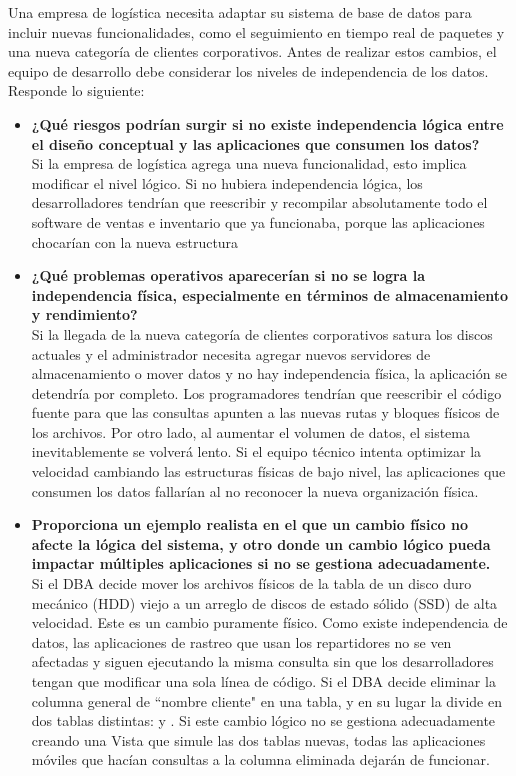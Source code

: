 \item Una empresa de logística necesita adaptar su sistema de base de datos para incluir nuevas funcionalidades, como el seguimiento en tiempo real de paquetes y una nueva categoría de clientes corporativos. Antes de realizar estos cambios, el equipo de desarrollo debe considerar los niveles de independencia de los datos. Responde lo siguiente:

\begin{itemize}
	\item \textbf{¿Qué riesgos podrían surgir si no existe independencia lógica entre el diseño conceptual y las aplicaciones que consumen los datos?}\\
	      Si la empresa de logística agrega una nueva funcionalidad, esto implica modificar el nivel lógico. Si no hubiera independencia lógica, los desarrolladores tendrían que reescribir y recompilar absolutamente todo el software de ventas e inventario que ya funcionaba, porque las aplicaciones chocarían con la nueva estructura

	\item \textbf{¿Qué problemas operativos aparecerían si no se logra la independencia física, especialmente en términos de almacenamiento y rendimiento?}\\
	      Si la llegada de la nueva categoría de clientes corporativos satura los discos actuales y el administrador necesita agregar nuevos servidores de almacenamiento o mover datos y no hay independencia física, la aplicación se detendría por completo. Los programadores tendrían que reescribir el código fuente para que las consultas apunten a las nuevas rutas y bloques físicos de los archivos. Por otro lado, al aumentar el volumen de datos, el sistema inevitablemente se volverá lento. Si el equipo técnico intenta optimizar la velocidad cambiando las estructuras físicas de bajo nivel, las aplicaciones que consumen los datos fallarían al no reconocer la nueva organización física.

	\item \textbf{Proporciona un ejemplo realista en el que un cambio físico no afecte la lógica del sistema, y otro donde un cambio lógico pueda impactar múltiples aplicaciones si no se gestiona adecuadamente.}\\
	      Si el DBA decide mover los archivos físicos de la tabla  de un disco duro mecánico (HDD) viejo a un arreglo de discos de estado sólido (SSD) de alta velocidad. Este es un cambio puramente físico. Como existe independencia de datos, las aplicaciones de rastreo que usan los repartidores no se ven afectadas y siguen ejecutando la misma consulta sin que los desarrolladores tengan que modificar una sola línea de código.
	      Si el DBA decide eliminar la columna general de “nombre cliente" en una tabla, y en su lugar la divide en dos tablas distintas:  y . Si este cambio lógico no se gestiona adecuadamente creando una Vista que simule las dos tablas nuevas, todas las aplicaciones móviles que hacían consultas a la columna eliminada dejarán de funcionar.

\end{itemize}
